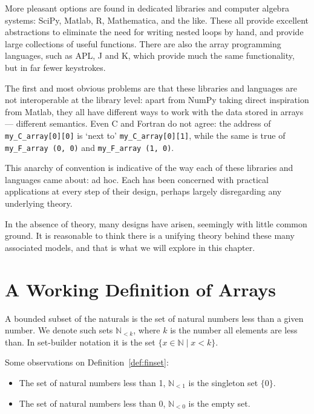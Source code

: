 \documentclass{DIKU-report-variant}
\newcommand\Nat{\mathbb{N}}
\begin{document}
More pleasant options are found in dedicated libraries and computer algebra systems: SciPy, Matlab,
R, Mathematica, and the like. These all provide excellent abstractions 
to eliminate the need for writing nested loops by hand, and provide
large collections of useful functions.
There are also the array programming languages, such as APL, J and K, which provide
much the same functionality, but in far fewer keystrokes.

The first and most obvious problems are that these libraries and languages are not interoperable
at the library level: apart from NumPy taking direct inspiration from Matlab, they
all have different ways to work with the data stored in arrays --- different semantics.
Even C and Fortran do not agree: the address of \texttt{my\_C\_array[0][0]} is `next
to' \texttt{my\_C\_array[0][1]}, while the same is true of \texttt{my\_F\_array (0, 0)}
and \texttt{my\_F\_array (1, 0)}.

This anarchy of convention is indicative of the way each of these libraries and
languages came about: ad hoc. Each has been concerned with practical applications
at every step of their design, perhaps largely disregarding any underlying theory.

In the absence of theory, many designs have arisen, seemingly with little common
ground. It is reasonable to think there is a unifying theory behind these many associated
models, and that is what we will explore in this chapter.

\section{A Working Definition of Arrays}

\begin{definition}
  \label{def:finset}
  A bounded subset of the naturals is
  the set of natural numbers less than a given number.
  We denote such sets \(\Nat_{<k}\), where \(k\) is the number
  all elements are less than. In set-builder notation it is the set \(\{ x \in \Nat \mid x < k \}\).
\end{definition}
\begin{observation}
  \label{ob:finset}
  Some observations on Definition~\ref{def:finset}:
  \begin{itemize}
    \item The set of natural numbers less than 1, \(\Nat_{<1}\) is the singleton set \(\{0\}\).
    \item The set of natural numbers less than 0, \(\Nat_{<0}\) is the empty set.
  \end{itemize}
\end{observation}
\end{document}

